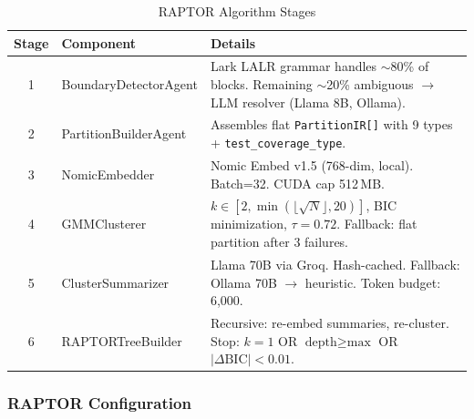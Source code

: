 \documentclass[11pt,a4paper]{article}
\begin{document}
\begin{table}[H]
\centering
\caption{RAPTOR Algorithm Stages}
\renewcommand{\arraystretch}{1.3}
\small
\begin{tabularx}{\textwidth}{@{} c l X @{}}
\toprule
\textbf{Stage} & \textbf{Component} & \textbf{Details} \\
\midrule
1 & BoundaryDetectorAgent & Lark LALR grammar handles $\sim$80\% of blocks. Remaining $\sim$20\% ambiguous $\to$ LLM resolver (Llama 8B, Ollama). \\
2 & PartitionBuilderAgent & Assembles flat \texttt{PartitionIR[]} with 9 types + \texttt{test\_coverage\_type}. \\
3 & NomicEmbedder & Nomic Embed v1.5 (768-dim, local). Batch=32. CUDA cap 512\,MB. \\
4 & GMMClusterer & $k \in [2, \min(\lfloor\sqrt{N}\rfloor, 20)]$, BIC minimization, $\tau=0.72$. Fallback: flat partition after 3 failures. \\
5 & ClusterSummarizer & Llama 70B via Groq. Hash-cached. Fallback: Ollama 70B $\to$ heuristic. Token budget: 6,000. \\
6 & RAPTORTreeBuilder & Recursive: re-embed summaries, re-cluster. Stop: $k{=}1$ OR $\text{depth}{\geq}\text{max}$ OR $|\Delta\text{BIC}|<0.01$. \\
\bottomrule
\end{tabularx}
\end{table}

\subsubsection{RAPTOR Configuration}
\end{document}
